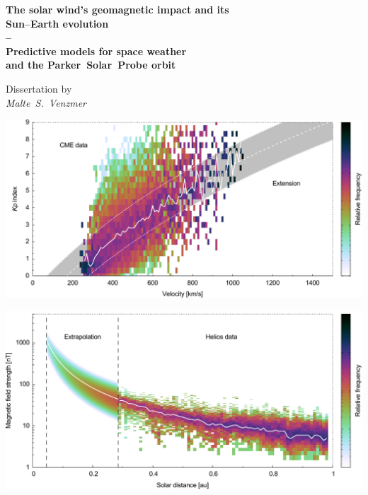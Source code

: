 
\begin{titlepage}
	
\end{titlepage}

\vspace*{\fill}
\begin{center}
	{\LARGE\sffamily
		\textbf{The solar wind's geomagnetic impact and its\\Sun--Earth evolution\\--\\Predictive models for space weather\\and the Parker~Solar~Probe orbit}\\
	}
	\renewcommand{\baselinestretch}{1.5}
	
	\vspace{3\baselineskip}
	\Large\rmfamily
	Dissertation by\\
	
	\textit{Malte~S.~Venzmer}\\
	
	\vspace{2\baselineskip}
	
	\begin{minipage}{0.9\textwidth}
		\includegraphics[width=\textwidth]{figures_of_mine/gnuplots/titlepage_plot_ch2_kpvsv_cmes_c2.pdf}
	\end{minipage}
	
	\vspace{0.5\baselineskip}
	
	\begin{minipage}{0.9\textwidth}
		\includegraphics[width=\textwidth]{figures_of_mine/gnuplots/fit_fixed_B_paper_h_title.pdf}
	\end{minipage}
\end{center}
\vfill

